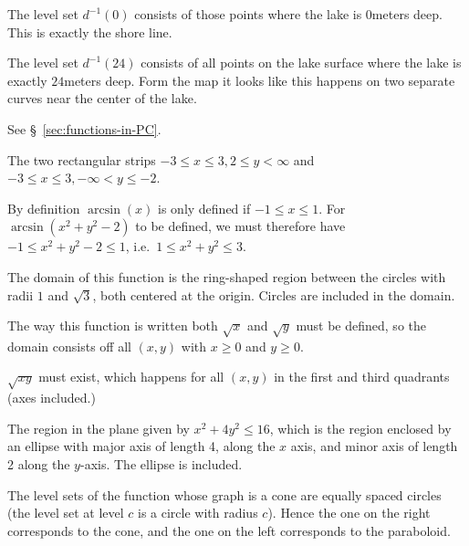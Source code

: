 The level set $d^{-1}(0)$ consists of those points where the lake is $0$meters
deep.  This is exactly the shore line.

The level set $d^{-1}(24)$ consists of all points on the lake surface where the
lake is exactly $24$meters deep.  Form the map it looks like this happens on two
separate curves near the center of the lake.
\bigskip

\item[{\bfseries(III5.10)}]

See \S~\ref{sec:functions-in-PC}.
\bigskip

\item[{\bfseries(III5.11a)}]

The two rectangular strips $-3\leq x\leq3, 2\leq y<\infty$ and
$-3\leq x\leq3, -\infty<y\leq-2$.
\bigskip

\item[{\bfseries(III5.11b)}]

By definition $\arcsin(x)$ is only defined if $-1\leq x\leq1$.
For $\arcsin(x^2+y^2-2)$ to be defined, we must therefore have
$-1\leq x^2+y^2-2 \leq 1$, i.e.\ $1\leq x^2+y^2 \leq 3$.

The domain of this function is
the ring-shaped region between the circles with radii $1$ and
$\sqrt{3}$, both centered at the origin.
Circles are included in the domain.
\bigskip

\item[{\bfseries(III5.11c)}]

The way this function is written both $\sqrt x$ and $\sqrt y$ must be defined,
so the domain consists off all $(x,y)$ with $x\geq0$ and $y\geq0$.
\bigskip

\item[{\bfseries(III5.11d)}]

$\sqrt{xy}$ must exist, which happens for all $(x,y)$ in the first
and third quadrants (axes included.)
\bigskip

\item[{\bfseries(III5.11f)}]

The region in the plane given by $x^2+4y^2\leq16$, which is the region
enclosed by an ellipse with
major axis of length 4, along the $x$ axis, and minor axis of length
2 along the $y$-axis.  The ellipse is included.
\bigskip

\item[{\bfseries(III5.12)}]

The level sets of the function whose graph is a cone are equally spaced circles
(the level set at level $c$ is a circle with radius $c$).  Hence the one on the
right corresponds to the cone, and
the one on the left corresponds to the paraboloid.
\bigskip


